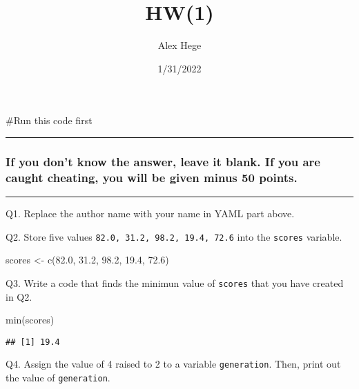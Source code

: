 \documentclass[
]{article}
\title{HW(1)}
\author{Alex Hege}
\date{1/31/2022}
\newenvironment{Shaded}{\begin{snugshade}}{\end{snugshade}}
\newcommand{\FloatTok}[1]{\textcolor[rgb]{0.00,0.00,0.81}{#1}}
\newcommand{\FunctionTok}[1]{\textcolor[rgb]{0.00,0.00,0.00}{#1}}
\newcommand{\NormalTok}[1]{#1}
\newcommand{\OtherTok}[1]{\textcolor[rgb]{0.56,0.35,0.01}{#1}}
\begin{document}
\maketitle

\#Run this code first

\begin{center}\rule{0.5\linewidth}{0.5pt}\end{center}

\hypertarget{if-you-dont-know-the-answer-leave-it-blank.-if-you-are-caught-cheating-you-will-be-given-minus-50-points.}{%
\subsubsection{If you don't know the answer, leave it blank. If you are
caught cheating, you will be given minus 50
points.}\label{if-you-dont-know-the-answer-leave-it-blank.-if-you-are-caught-cheating-you-will-be-given-minus-50-points.}}

\begin{center}\rule{0.5\linewidth}{0.5pt}\end{center}

Q1. Replace the author name with your name in YAML part above.

Q2. Store five values \texttt{82.0,\ 31.2,\ 98.2,\ 19.4,\ 72.6} into the
\texttt{scores} variable.

\begin{Shaded}
\begin{Highlighting}[]
\NormalTok{scores }\OtherTok{\textless{}{-}} \FunctionTok{c}\NormalTok{(}\FloatTok{82.0}\NormalTok{, }\FloatTok{31.2}\NormalTok{, }\FloatTok{98.2}\NormalTok{, }\FloatTok{19.4}\NormalTok{, }\FloatTok{72.6}\NormalTok{)}
\end{Highlighting}
\end{Shaded}

Q3. Write a code that finds the minimun value of \texttt{scores} that
you have created in Q2.

\begin{Shaded}
\begin{Highlighting}[]
\FunctionTok{min}\NormalTok{(scores)}
\end{Highlighting}
\end{Shaded}

\begin{verbatim}
## [1] 19.4
\end{verbatim}

Q4. Assign the value of 4 raised to 2 to a variable \texttt{generation}.
Then, print out the value of \texttt{generation}.
\end{document}
